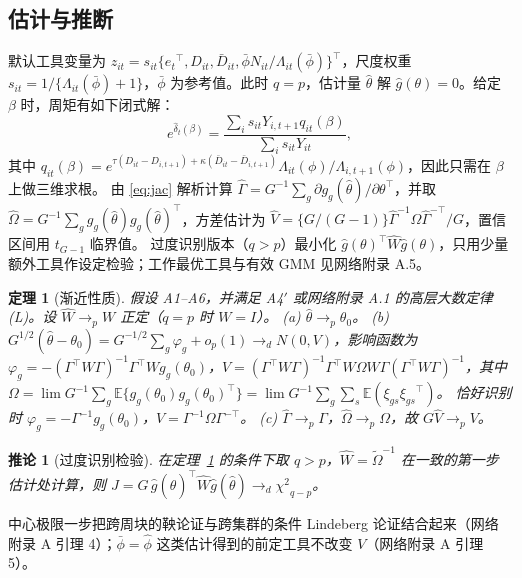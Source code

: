 \documentclass[11pt,a4paper]{ctexart}
\newtheorem{theorem}{定理}
\newtheorem{corollary}{推论}
\theoremstyle{definition}
\newcommand{\E}{\mathbb{E}}
\begin{document}
\subsection{估计与推断}
\label{ss:estimation}

默认工具变量为 $z_{it}=s_{it}\{{e_t}^{\top},D_{it},\bar D_{it},\bar\phi N_{it}/\Lambda_{it}(\bar\phi)\}^{\top}$，尺度权重 $s_{it}=1/\{\Lambda_{it}(\bar\phi)+1\}$，$\bar\phi$ 为参考值。此时 $q=p$，估计量 $\hat\theta$ 解 $\hat g(\theta)=0$。给定 $\beta$ 时，周矩有如下闭式解：
\begin{equation}
e^{\hat\delta_t(\beta)}=\frac{\sum_i s_{it}Y_{i,t+1}q_{it}(\beta)}{\sum_i s_{it}Y_{it}},
\label{eq:profile}
\end{equation}
其中 $q_{it}(\beta)=e^{\tau(D_{it}-D_{i,t+1})+\kappa(\bar D_{it}-\bar D_{i,t+1})}\Lambda_{it}(\phi)/\Lambda_{i,t+1}(\phi)$，因此只需在 $\beta$ 上做三维求根。
由 \eqref{eq:jac} 解析计算 $\hat\Gamma=G^{-1}\sum_g\partial g_g(\hat\theta)/\partial\theta^{\top}$，并取 $\hat\Omega=G^{-1}\sum_g g_g(\hat\theta)g_g(\hat\theta)^{\top}$，方差估计为 $\hat V=\{G/(G-1)\}\hat\Gamma^{-1}\hat\Omega\hat\Gamma^{-\top}/G$，置信区间用 $t_{G-1}$ 临界值。
过度识别版本（$q>p$）最小化 $\hat g(\theta)^{\top}\hat W\hat g(\theta)$，只用少量额外工具作设定检验；工作最优工具与有效 GMM 见网络附录 A.5。

\begin{theorem}[渐近性质]
\label{thm:asy}
假设 A1--A6，并满足 A4$'$ 或网络附录 A.1 的高层大数定律 (L)。设 $\hat W\to_p W$ 正定（$q=p$ 时 $W=I$）。
(a) $\hat\theta\to_p\theta_0$。
(b) $G^{1/2}(\hat\theta-\theta_0)=G^{-1/2}\sum_g\varphi_g+o_p(1)\to_d N(0,V)$，影响函数为 $\varphi_g=-(\Gamma^{\top}W\Gamma)^{-1}\Gamma^{\top}Wg_g(\theta_0)$，$V=(\Gamma^{\top}W\Gamma)^{-1}\Gamma^{\top}W\Omega W\Gamma(\Gamma^{\top}W\Gamma)^{-1}$，其中 $\Omega=\lim G^{-1}\sum_g\E\{g_g(\theta_0)g_g(\theta_0)^{\top}\}=\lim G^{-1}\sum_g\sum_s\E(\xi_{gs}{\xi_{gs}}^{\top})$。
恰好识别时 $\varphi_g=-\Gamma^{-1}g_g(\theta_0)$，$V=\Gamma^{-1}\Omega\Gamma^{-\top}$。
(c) $\hat\Gamma\to_p\Gamma$，$\hat\Omega\to_p\Omega$，故 $G\hat V\to_p V$。
\end{theorem}

\begin{corollary}[过度识别检验]
\label{cor:J}
在定理~\ref{thm:asy} 的条件下取 $q>p$，$\hat W=\tilde\Omega^{-1}$ 在一致的第一步估计处计算，则 $J=G\,\hat g(\hat\theta)^{\top}\hat W\hat g(\hat\theta)\to_d{\chi^2}_{q-p}$。
\end{corollary}

中心极限一步把跨周块的鞅论证与跨集群的条件 Lindeberg 论证结合起来（网络附录 A 引理 4）；$\bar\phi=\hat\phi$ 这类估计得到的前定工具不改变 $V$（网络附录 A 引理 5）。
\end{document}
